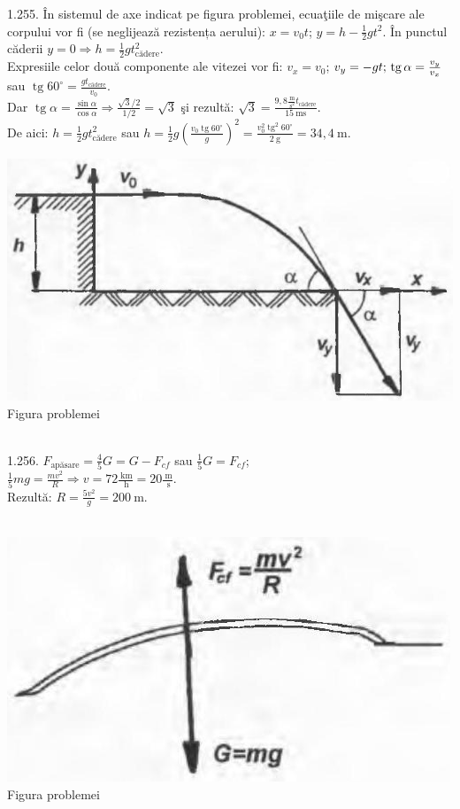 1.255. În sistemul de axe indicat pe figura problemei, ecuaţiile de mişcare ale corpului vor fi (se neglijează rezistența aerului): $x=v_{0} t$; $y=h-\frac{1}{2} g t^{2}$. În punctul căderii $y=0 \Rightarrow h=\frac{1}{2} g t_{\text {cădere}}^{2}$.\\ Expresiile celor două componente ale vitezei vor fi: $v_{x}=v_{0}$; $v_{y}=-g t;\\ \operatorname{tg} \alpha=\frac{v_{y}}{v_{x}}$ sau $\operatorname{tg} 60^{\circ}=\frac{g t_{\text {cădere}}}{v_{0}}$.\\ Dar $\operatorname{tg} \alpha=\frac{\sin \alpha}{\cos \alpha} \Rightarrow \frac{\sqrt{3} / 2}{1 / 2}=\sqrt{3}$ şi rezultă: $\sqrt{3}=\frac{9,8 \frac{\mathrm{~m}}{\mathrm{~s}^{2}} t_{\text {cădere}}}{15 \mathrm{~ms}}$.\\ De aici: $h=\frac{1}{2} g t_{\text {cădere}}^{2}$ sau $h=\frac{1}{2} g\left(\frac{v_{0} \operatorname{tg} 60^{\circ}}{g}\right)^{2}=\frac{v_{0}^{2} \operatorname{tg}^{2} 60^{\circ}}{2 \mathrm{~g}}=34,4 \mathrm{~m}$.\\ \begin{center} \includegraphics[width=0.4\linewidth]{images/2025_07_01_5b3ff9fa0d508c8e9f17g-253(2)}\\ Figura problemei \end{center}\\

1.256. $F_{\text {apăsare}}=\frac{4}{5} G=G-F_{c f}$ sau $\frac{1}{5} G=F_{c f}$;\\ $\frac{1}{5} m g=\frac{m v^{2}}{R} \Rightarrow v=72 \frac{\mathrm{~km}}{\mathrm{~h}}=20 \frac{\mathrm{~m}}{\mathrm{~s}}$.\\ Rezultă: $R=\frac{5 v^{2}}{g}=200 \mathrm{~m}$.\\ \\ \begin{center} \includegraphics[width=0.4\linewidth]{images/2025_07_01_5b3ff9fa0d508c8e9f17g-253(1)}\\ Figura problemei \end{center}\\

